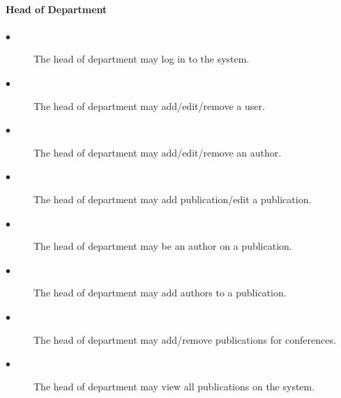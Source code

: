 \documentclass[a4paper]{article}
\begin{document}
	\paragraph{\textbf{Head of Department}}
	\begin{description}
		\item[$\bullet$] The head of department may log in to the system.
		\item[$\bullet$] The head of department may add/edit/remove a user.
		\item[$\bullet$] The head of department may add/edit/remove an author.
		\item[$\bullet$] The head of department may add publication/edit a publication.
		\item[$\bullet$] The head of department may be an author on a publication.
		\item[$\bullet$] The head of department may add authors to a publication.
		\item[$\bullet$] The head of department may add/remove publications for conferences.
		\item[$\bullet$] The head of department may view all publications on the system.
	\end{description}
\end{document}
